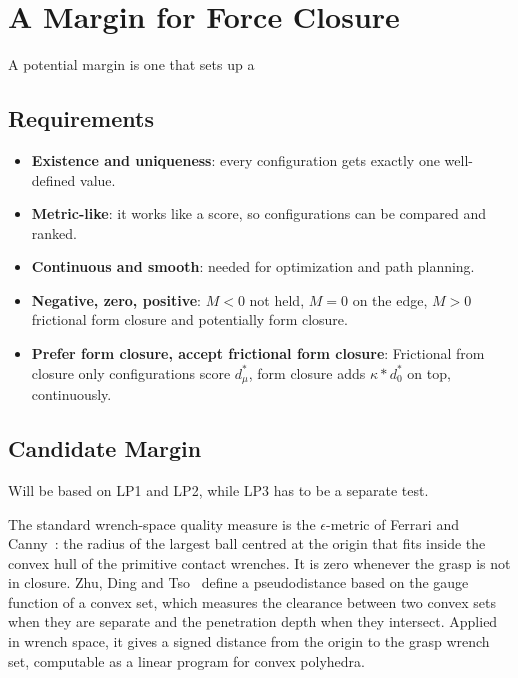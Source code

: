 \chapter{A Margin for Force Closure}
\label{chap:margin}
A potential margin is one that sets up a

\section{Requirements}
\label{sec:margin-requirements}
\begin{itemize}
    \item \textbf{Existence and uniqueness}: every configuration gets exactly one well-defined value.
    \item \textbf{Metric-like}: it works like a score, so configurations can be compared and ranked.
    \item \textbf{Continuous and smooth}: needed for optimization and path planning.
    \item \textbf{Negative, zero, positive}: $M<0$ not held, $M=0$ on the edge, $M>0$ frictional form closure and potentially form closure.
    \item \textbf{Prefer form closure, accept frictional form closure}: Frictional from closure only configurations score $d^*_\mu$, form closure adds $\kappa*d^*_0$ on top, continuously.
\end{itemize}


\section{Candidate Margin}
\label{sec:candidate-margins}
Will be based on LP1 and LP2, while LP3 has to be a separate test.

The standard wrench-space quality measure is the $\epsilon$-metric of
Ferrari and Canny~\cite{ferrari1992planning}: the radius of the largest
ball centred at the origin that fits inside the convex hull of the
primitive contact wrenches. It is zero whenever the grasp is not in
closure. Zhu, Ding and Tso~\cite{zhu2004pseudodistance} define a
pseudodistance based on the gauge function of a convex set, which measures
the clearance between two convex sets when they are separate and the
penetration depth when they intersect. Applied in wrench space, it gives a
signed distance from the origin to the grasp wrench set, computable as a
linear program for convex polyhedra.

